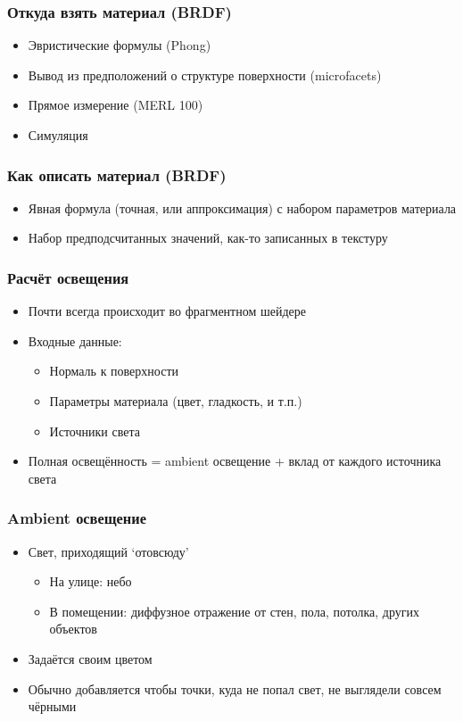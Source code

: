 \documentclass{beamer}
\begin{document}
\begin{frame}[fragile]
\frametitle{Откуда взять материал (BRDF)}
\begin{itemize}
\item Эвристические формулы (Phong)
\pause
\item Вывод из предположений о структуре поверхности (microfacets)
\pause
\item Прямое измерение (MERL 100)
\pause
\item Симуляция
\end{itemize}
\end{frame}

\begin{frame}[fragile]
\frametitle{Как описать материал (BRDF)}
\begin{itemize}
\item Явная формула (точная, или аппроксимация) с набором параметров материала
\pause
\item Набор предподсчитанных значений, как-то записанных в текстуру
\end{itemize}
\end{frame}

\begin{frame}[fragile]
\frametitle{Расчёт освещения}
\begin{itemize}
\item Почти всегда происходит во фрагментном шейдере
\pause
\item Входные данные:
\begin{itemize}
\item Нормаль к поверхности
\item Параметры материала (цвет, гладкость, и т.п.)
\item Источники света
\end{itemize}
\pause
\item Полная освещённость = ambient освещение + вклад от каждого источника света
\end{itemize}
\end{frame}

\begin{frame}[fragile]
\frametitle{Ambient освещение}
\begin{itemize}
\item Свет, приходящий `отовсюду'
\begin{itemize}
\item На улице: небо
\item В помещении: диффузное отражение от стен, пола, потолка, других объектов
\end{itemize}
\pause
\item Задаётся своим цветом
\item Обычно добавляется чтобы точки, куда не попал свет, не выглядели совсем чёрными
\end{itemize}
\end{frame}
\end{document}
